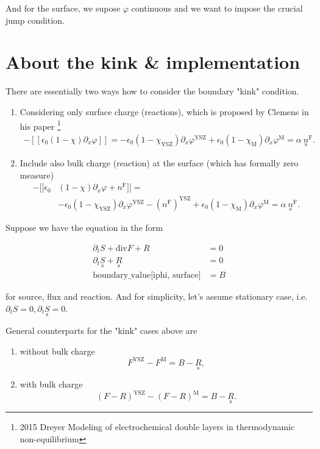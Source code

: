 \documentclass{article}
\numberwithin{equation}{section}
\newcommand{\us}[1]{\underset{\textrm{s}}{#1}{}}
\def \YSZ{\textrm{YSZ}}
\def \M{\textrm{M}}
\def \varphiY{\varphi^\YSZ}
\def \varphiM{\varphi^\M}
\begin{document}
And for the surface, we supose $\varphi$ continuous and we want to impose the crucial jump condition.


\section{About the kink \& implementation}
There are essentially two ways how to consider the boundary "kink" condition.

\begin{enumerate}
\item Considering only surface charge (reactions), which is proposed by Clemens in his paper \footnote{2015 Dreyer Modeling of electrochemical double layers in thermodynamic non-equilibrium}
\begin{align}
- [\![\epsilon_0 (1 - \chi) \partial_x \varphi]\!] = - \epsilon_0 (1-\chi_\YSZ) \partial_x \varphiY + \epsilon_0 (1-\chi_\M) \partial_x \varphiM  =   \alpha \ \us n^\textrm{F}.
\end{align}


\item Include also bulk charge (reaction) at the surface (which has formally zero measure)
\begin{align}
- [\![\epsilon_0 &(1 - \chi) \partial_x \varphi + n^\textrm{F} ] \!] 
= \nonumber
\\
&- \epsilon_0 (1-\chi_\YSZ) \partial_x \varphiY - (n^\textrm{F})^{\YSZ}
+ 
\epsilon_0 (1-\chi_\M) \partial_x \varphiM  
=   
\alpha \ \us n^\textrm{F}.
\end{align}
\end{enumerate}



Suppose we have the equation in the form

\begin{align}
\partial_t S + \textrm{div} F + R &= 0  \label{abst:bulk}
\\
\partial_t \us S + \us R &= 0 \label{abst:surf}
\\
\textrm{boundary\_value[iphi, surface]} &= B
\end{align}

for source, flux and reaction.  And for simplicity, let's assume stationary case, i.e. $\partial_t S = 0, \partial_t \us S = 0$.

General counterparts for the "kink" cases above are
\begin{enumerate}
\item without bulk charge
$$ F^\YSZ - F^\M = B - \us R,$$

\item with bulk charge
$$ (F-R)^\YSZ - (F-R)^\M = B - \us R.$$
\end{enumerate}
\end{document}
